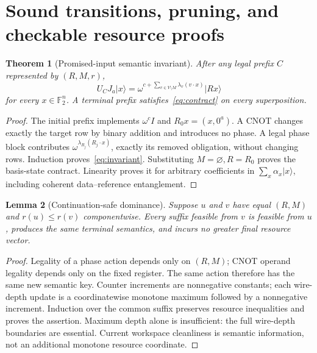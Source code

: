\documentclass[11pt]{article}
\newtheorem{theorem}{Theorem}
\newtheorem{lemma}[theorem]{Lemma}
\theoremstyle{definition}\newtheorem{definition}[theorem]{Definition}
\newcommand{\F}{\mathbb F_2}
\newcommand{\ket}[1]{\lvert #1\rangle}
\begin{document}
\section{Sound transitions, pruning, and checkable resource proofs}
\begin{theorem}[Promised-input semantic invariant]
After any legal prefix $C$ represented by $(R,M,r)$,
\begin{equation}
U_CJ_a\ket{x}=\omega^{c+\sum_{v\in V\setminus M}\lambda_v(v\cdot x)}\ket{Rx}
\label{eq:invariant}
\end{equation}
for every $x\in\F^n$. A terminal prefix satisfies~\eqref{eq:contract} on every superposition.
\end{theorem}
\begin{proof}
The initial prefix implements $\omega^c I$ and $R_0x=(x,0^a)$. A CNOT changes exactly the target row by binary addition and introduces no phase. A legal phase block contributes $\omega^{\lambda_{R_j}(R_j\cdot x)}$, exactly its removed obligation, without changing rows. Induction proves~\eqref{eq:invariant}. Substituting $M=\varnothing,R=R_0$ proves the basis-state contract. Linearity proves it for arbitrary coefficients in $\sum_x\alpha_x\ket{x}$, including coherent data--reference entanglement.
\end{proof}

\begin{lemma}[Continuation-safe dominance]
Suppose $u$ and $v$ have equal $(R,M)$ and $r(u)\le r(v)$ componentwise. Every suffix feasible from $v$ is feasible from $u$, produces the same terminal semantics, and incurs no greater final resource vector.
\end{lemma}
\begin{proof}
Legality of a phase action depends only on $(R,M)$; CNOT operand legality depends only on the fixed register. The same action therefore has the same new semantic key. Counter increments are nonnegative constants; each wire-depth update is a coordinatewise monotone maximum followed by a nonnegative increment. Induction over the common suffix preserves resource inequalities and proves the assertion. Maximum depth alone is insufficient: the full wire-depth boundaries are essential. Current workspace cleanliness is semantic information, not an additional monotone resource coordinate.
\end{proof}
\end{document}
